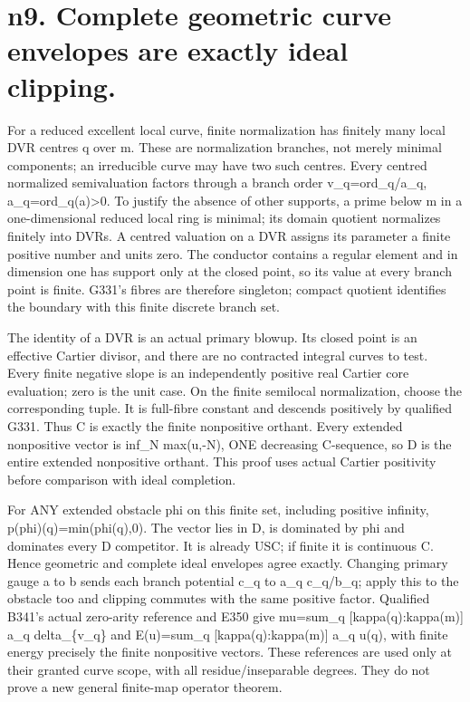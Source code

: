\documentclass[11pt]{article}
\begin{document}
\section*{n9. Complete geometric curve envelopes are exactly ideal clipping.}
For a reduced excellent local curve, finite normalization has finitely many local DVR centres q over m. These are normalization branches, not merely minimal components; an irreducible curve may have two such centres. Every centred normalized semivaluation factors through a branch order v\_q=ord\_q/a\_q, a\_q=ord\_q(a)>0. To justify the absence of other supports, a prime below m in a one-dimensional reduced local ring is minimal; its domain quotient normalizes finitely into DVRs. A centred valuation on a DVR assigns its parameter a finite positive number and units zero. The conductor contains a regular element and in dimension one has support only at the closed point, so its value at every branch point is finite. G331's fibres are therefore singleton; compact quotient identifies the boundary with this finite discrete branch set.

The identity of a DVR is an actual primary blowup. Its closed point is an effective Cartier divisor, and there are no contracted integral curves to test. Every finite negative slope is an independently positive real Cartier core evaluation; zero is the unit case. On the finite semilocal normalization, choose the corresponding tuple. It is full-fibre constant and descends positively by qualified G331. Thus C is exactly the finite nonpositive orthant. Every extended nonpositive vector is inf\_N max(u,-N), ONE decreasing C-sequence, so D is the entire extended nonpositive orthant. This proof uses actual Cartier positivity before comparison with ideal completion.

For ANY extended obstacle phi on this finite set, including positive infinity, p(phi)(q)=min(phi(q),0). The vector lies in D, is dominated by phi and dominates every D competitor. It is already USC; if finite it is continuous C. Hence geometric and complete ideal envelopes agree exactly. Changing primary gauge a to b sends each branch potential c\_q to a\_q c\_q/b\_q; apply this to the obstacle too and clipping commutes with the same positive factor. Qualified B341's actual zero-arity reference and E350 give mu=sum\_q [kappa(q):kappa(m)] a\_q delta\_\{v\_q\} and E(u)=sum\_q [kappa(q):kappa(m)] a\_q u(q), with finite energy precisely the finite nonpositive vectors. These references are used only at their granted curve scope, with all residue/inseparable degrees. They do not prove a new general finite-map operator theorem.
\end{document}
